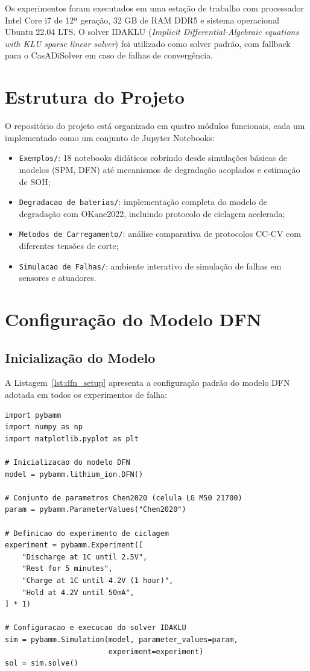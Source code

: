 \documentclass[
    12pt,
    openright,
    twoside,
    a4paper,
    brazil,
    english
]{abntex2}
\begin{document}
Os experimentos foram executados em uma estação de trabalho com processador
Intel Core i7 de 12ª geração, 32 GB de RAM DDR5 e sistema operacional Ubuntu
22.04 LTS. O solver IDAKLU (\textit{Implicit Differential-Algebraic equations
with KLU sparse linear solver}) foi utilizado como solver padrão, com fallback
para o CasADiSolver em caso de falhas de convergência.

\section{Estrutura do Projeto}

O repositório do projeto está organizado em quatro módulos funcionais, cada
um implementado como um conjunto de Jupyter Notebooks:

\begin{itemize}
  \item \texttt{Exemplos/}: 18 notebooks didáticos cobrindo desde simulações
        básicas de modelos (SPM, DFN) até mecanismos de degradação acoplados
        e estimação de SOH;
  \item \texttt{Degradacao de baterias/}: implementação completa do modelo de
        degradação com OKane2022, incluindo protocolo de ciclagem acelerada;
  \item \texttt{Metodos de Carregamento/}: análise comparativa de protocolos
        CC-CV com diferentes tensões de corte;
  \item \texttt{Simulacao de Falhas/}: ambiente interativo de simulação de
        falhas em sensores e atuadores.
\end{itemize}

\section{Configuração do Modelo DFN}

\subsection{Inicialização do Modelo}

A Listagem~\ref{lst:dfn_setup} apresenta a configuração padrão do modelo DFN
adotada em todos os experimentos de falha:

\begin{lstlisting}[caption={Configuração base do modelo DFN com parâmetros Chen2020.},
                   label={lst:dfn_setup}]
import pybamm
import numpy as np
import matplotlib.pyplot as plt

# Inicializacao do modelo DFN
model = pybamm.lithium_ion.DFN()

# Conjunto de parametros Chen2020 (celula LG M50 21700)
param = pybamm.ParameterValues("Chen2020")

# Definicao do experimento de ciclagem
experiment = pybamm.Experiment([
    "Discharge at 1C until 2.5V",
    "Rest for 5 minutes",
    "Charge at 1C until 4.2V (1 hour)",
    "Hold at 4.2V until 50mA",
] * 1)

# Configuracao e execucao do solver IDAKLU
sim = pybamm.Simulation(model, parameter_values=param,
                        experiment=experiment)
sol = sim.solve()
\end{lstlisting}
\end{document}

